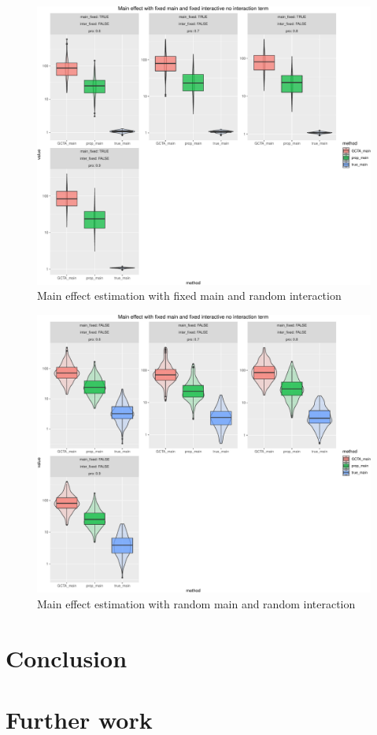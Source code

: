 \documentclass[]{article}
\begin{document}
\begin{figure}
\centering
\includegraphics{Simulation_report_files/figure-latex/main effect fixed random-1.pdf}
\caption{Main effect estimation with fixed main and random interaction}
\end{figure}

\begin{figure}
\centering
\includegraphics{Simulation_report_files/figure-latex/main effect random random-1.pdf}
\caption{Main effect estimation with random main and random interaction}
\end{figure}

\section{Conclusion}\label{conclusion}

\section{Further work}\label{further-work}
\end{document}
